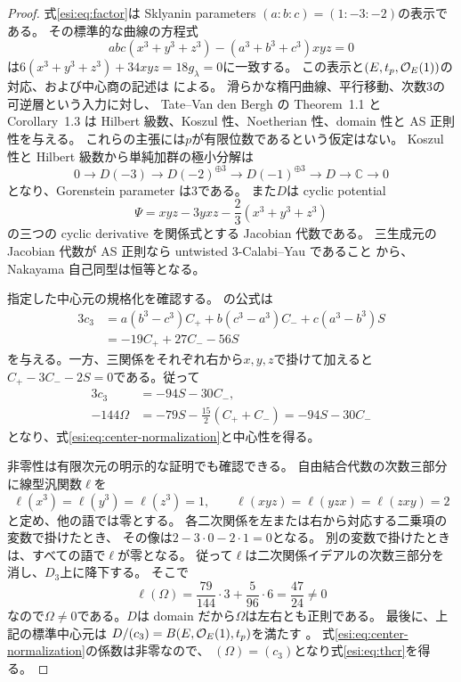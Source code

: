 \begin{proof}
式\eqref{esi:eq:factor}は Sklyanin parameters
$(a:b:c)=(1:-3:-2)$の表示である。
その標準的な曲線の方程式
\[
 abc(x^3+y^3+z^3)-(a^3+b^3+c^3)xyz=0
\]
は$6(x^3+y^3+z^3)+34xyz=18g_\lambda=0$に一致する。
この表示と$(E,t_p,\mathcal O_E(1))$の対応、および中心商の記述は
\cite[Section~1, p.~1]{GRSklyaninDLL}による。
滑らかな楕円曲線、平行移動、次数$3$の可逆層という入力に対し、
Tate--Van den Bergh の Theorem~1.1 と Corollary~1.3
\cite[著者版 pp.~2--3; 構成は Section~4.1]{GRSklyaninTV}は
Hilbert 級数、Koszul 性、Noetherian 性、domain 性と AS 正則性を与える。
これらの主張には$p$が有限位数であるという仮定はない。
Koszul 性と Hilbert 級数から単純加群の極小分解は
\[
 0\longrightarrow D(-3)\longrightarrow D(-2)^{\oplus3}
 \longrightarrow D(-1)^{\oplus3}\longrightarrow D
 \longrightarrow\mathbb C\longrightarrow0
\]
となり、Gorenstein parameter は$3$である。
また$D$は cyclic potential
\[
 \Psi=xyz-3yxz-\frac23(x^3+y^3+z^3)
\]
の三つの cyclic derivative を関係式とする Jacobian 代数である。
三生成元の Jacobian 代数が AS 正則なら untwisted $3$-Calabi--Yau であること
\cite[Corollary~2.9]{MoriSmith}から、Nakayama 自己同型は恒等となる。

指定した中心元の規格化を確認する。
\cite[Section~2, p.~3]{GRSklyaninDLL}の公式は
\[
 \begin{aligned}
 3c_3&=a(b^3-c^3)C_++b(c^3-a^3)C_-+c(a^3-b^3)S\\
     &=-19C_++27C_--56S
 \end{aligned}
\]
を与える。一方、三関係をそれぞれ右から$x,y,z$で掛けて加えると
$C_+-3C_--2S=0$である。従って
\[
 \begin{aligned}
 3c_3&=-94S-30C_-,\\
 -144\Omega&=-79S-\frac{15}{2}(C_++C_-)
              =-94S-30C_-
 \end{aligned}
\]
となり、式\eqref{esi:eq:center-normalization}と中心性を得る。

非零性は有限次元の明示的な証明でも確認できる。
自由結合代数の次数三部分に線型汎関数$\ell$を
\[
 \ell(x^3)=\ell(y^3)=\ell(z^3)=1,\qquad
 \ell(xyz)=\ell(yzx)=\ell(zxy)=2
\]
と定め、他の語では零とする。
各二次関係を左または右から対応する二乗項の変数で掛けたとき、
その像は$2-3\cdot0-2\cdot1=0$となる。
別の変数で掛けたときは、すべての語で$\ell$が零となる。
従って$\ell$は二次関係イデアルの次数三部分を消し、$D_3$上に降下する。
そこで
\[
 \ell(\Omega)=\frac{79}{144}\cdot3+\frac5{96}\cdot6
             =\frac{47}{24}\ne0
\]
なので$\Omega\ne0$である。$D$は domain だから$\Omega$は左右とも正則である。
最後に、上記の標準中心元は
$D/(c_3)=B(E,\mathcal O_E(1),t_p)$を満たす
\cite[Section~1, p.~1]{GRSklyaninDLL}。
式\eqref{esi:eq:center-normalization}の係数は非零なので、
$(\Omega)=(c_3)$となり式\eqref{esi:eq:thcr}を得る。
\end{proof}

